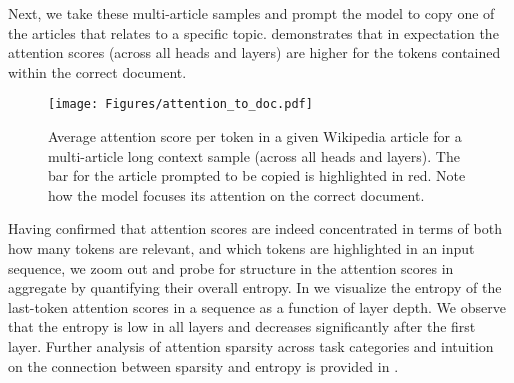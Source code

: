 Next, we take these multi-article samples and prompt the model to copy one of the articles that relates to a specific topic.  demonstrates that in expectation the attention scores (across all heads and layers) are higher for the tokens contained within the correct document. %

\begin{figure}[t!]
    \centering
    \texttt{[image: Figures/attention\_to\_doc.pdf]}
    \caption{Average attention score per token in a given Wikipedia article for a multi-article long context sample (across all heads and layers). The bar for the article prompted to be copied is highlighted in red. Note how the model focuses its attention on the correct document.}
    \label{fig:attentionDoc}
\end{figure}

Having confirmed that attention scores are indeed concentrated in terms of both how many tokens are relevant, and which tokens are highlighted in an input sequence, we zoom out and probe for structure in the attention scores in aggregate by quantifying their overall entropy. 
In  we visualize the entropy of the last-token attention scores in a sequence as a function of layer depth. We observe that the entropy is low in all layers and decreases significantly after the first layer. Further analysis of attention sparsity across task categories and intuition on the connection between sparsity and entropy is provided in .

